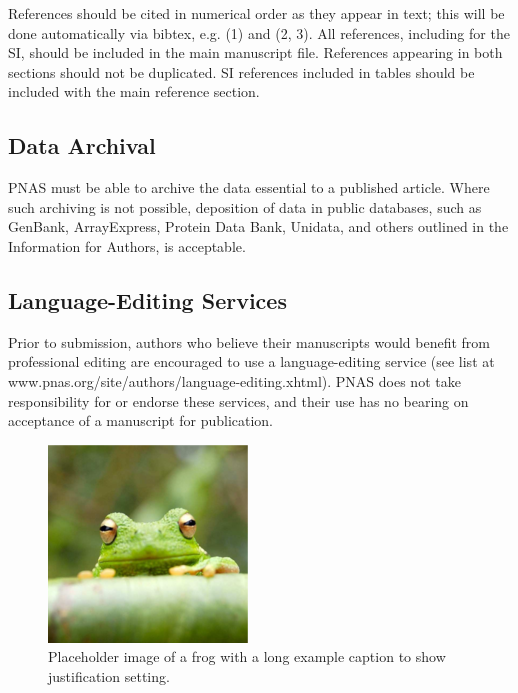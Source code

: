 \documentclass[9pt,twocolumn,twoside,]{pnas-new}
\begin{document}
References should be cited in numerical order as they appear in text;
this will be done automatically via bibtex, e.g. (1) and (2, 3). All
references, including for the SI, should be included in the main
manuscript file. References appearing in both sections should not be
duplicated. SI references included in tables should be included with the
main reference section.

\hypertarget{data-archival}{%
\subsection*{Data Archival}\label{data-archival}}

PNAS must be able to archive the data essential to a published article.
Where such archiving is not possible, deposition of data in public
databases, such as GenBank, ArrayExpress, Protein Data Bank, Unidata,
and others outlined in the Information for Authors, is acceptable.

\hypertarget{language-editing-services}{%
\subsection*{Language-Editing
Services}\label{language-editing-services}}

Prior to submission, authors who believe their manuscripts would benefit
from professional editing are encouraged to use a language-editing
service (see list at www.pnas.org/site/authors/language-editing.xhtml).
PNAS does not take responsibility for or endorse these services, and
their use has no bearing on acceptance of a manuscript for publication.

\begin{figure}
\centering
\includegraphics{frog.png}
\caption{Placeholder image of a frog with a long example caption to show
justification setting.{}}
\end{figure}
\end{document}
